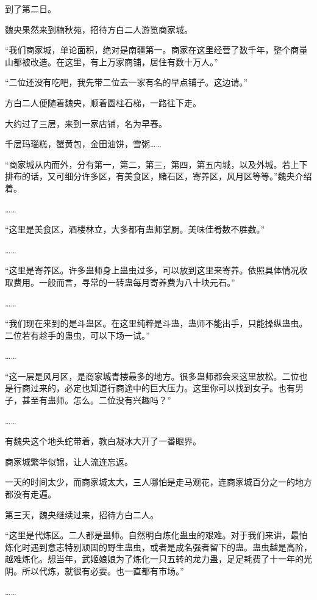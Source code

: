
\begin{this_body}

到了第二日。

魏央果然来到楠秋苑，招待方白二人游览商家城。

“我们商家城，单论面积，绝对是南疆第一。商家在这里经营了数千年，整个商量山都被改造。在这里，有上万家商铺，居住有数十万人。”

“二位还没有吃吧，我先带二位去一家有名的早点铺子。这边请。”

方白二人便随着魏央，顺着圆柱石梯，一路往下走。

大约过了三层，来到一家店铺，名为早春。

千层玛瑙糕，蟹黄包，金田油饼，雪粥……

“商家城从内而外，分有第一，第二，第三，第四，第五内城，以及外城。若上下排布的话，又可细分许多区，有美食区，赌石区，寄养区，风月区等等。”魏央介绍着。

……

“这里是美食区，酒楼林立，大多都有蛊师掌厨。美味佳肴数不胜数。”

……

“这里是寄养区。许多蛊师身上蛊虫过多，可以放到这里来寄养。依照具体情况收取费用。一般而言，寻常的一转蛊每月寄养费为八十块元石。”

……

“我们现在来到的是斗蛊区。在这里纯粹是斗蛊，蛊师不能出手，只能操纵蛊虫。二位若有趁手的蛊虫，可以下场一试。”

……

“这一层是风月区，是商家城青楼最多的地方。很多蛊师都会来这里放松。二位也是行商过来的，必定也知道行商途中的巨大压力。这里你可以找到女子。也有男子，甚至有蛊师。怎么。二位没有兴趣吗？”

……

有魏央这个地头蛇带着，教白凝冰大开了一番眼界。

商家城繁华似锦，让人流连忘返。

一天的时间太少，而商家城太大，三人哪怕是走马观花，连商家城百分之一的地方都没有走遍。

第三天，魏央继续过来，招待方白二人。

“这里是代炼区。二人都是蛊师。自然明白炼化蛊虫的艰难。对于我们来讲，最怕炼化时遇到意志特别顽固的野生蛊虫，或者是成名强者留下的蛊。蛊虫越是高阶，越难炼化。想当年，武姬娘娘为了炼化一只五转的龙力蛊，足足耗费了十一年的光阴。所以代炼，就很有必要。也一直都有市场。”

……


\end{this_body}
